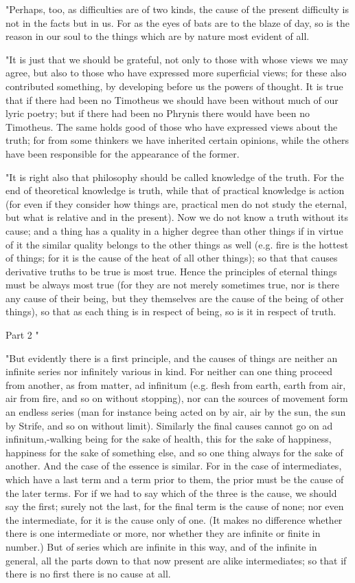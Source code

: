 "Perhaps, too, as difficulties are of two kinds, the cause of the
present difficulty is not in the facts but in us. For as the eyes
of bats are to the blaze of day, so is the reason in our soul to the
things which are by nature most evident of all. 

"It is just that we should be grateful, not only to those with whose
views we may agree, but also to those who have expressed more superficial
views; for these also contributed something, by developing before
us the powers of thought. It is true that if there had been no Timotheus
we should have been without much of our lyric poetry; but if there
had been no Phrynis there would have been no Timotheus. The same holds
good of those who have expressed views about the truth; for from some
thinkers we have inherited certain opinions, while the others have
been responsible for the appearance of the former. 

"It is right also that philosophy should be called knowledge of the
truth. For the end of theoretical knowledge is truth, while that of
practical knowledge is action (for even if they consider how things
are, practical men do not study the eternal, but what is relative
and in the present). Now we do not know a truth without its cause;
and a thing has a quality in a higher degree than other things if
in virtue of it the similar quality belongs to the other things as
well (e.g. fire is the hottest of things; for it is the cause of the
heat of all other things); so that that causes derivative truths to
be true is most true. Hence the principles of eternal things must
be always most true (for they are not merely sometimes true, nor is
there any cause of their being, but they themselves are the cause
of the being of other things), so that as each thing is in respect
of being, so is it in respect of truth. 

Part 2 "

"But evidently there is a first principle, and the causes of things
are neither an infinite series nor infinitely various in kind. For
neither can one thing proceed from another, as from matter, ad infinitum
(e.g. flesh from earth, earth from air, air from fire, and so on without
stopping), nor can the sources of movement form an endless series
(man for instance being acted on by air, air by the sun, the sun by
Strife, and so on without limit). Similarly the final causes cannot
go on ad infinitum,-walking being for the sake of health, this for
the sake of happiness, happiness for the sake of something else, and
so one thing always for the sake of another. And the case of the essence
is similar. For in the case of intermediates, which have a last term
and a term prior to them, the prior must be the cause of the later
terms. For if we had to say which of the three is the cause, we should
say the first; surely not the last, for the final term is the cause
of none; nor even the intermediate, for it is the cause only of one.
(It makes no difference whether there is one intermediate or more,
nor whether they are infinite or finite in number.) But of series
which are infinite in this way, and of the infinite in general, all
the parts down to that now present are alike intermediates; so that
if there is no first there is no cause at all. 

